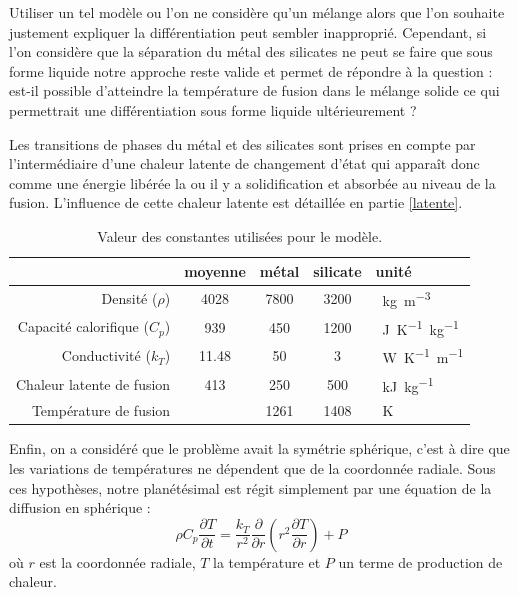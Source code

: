 \documentclass[10pt,a4paper]{article}
\numberwithin{equation}{section}
\begin{document}
Utiliser un tel modèle ou l'on ne considère qu'un mélange alors que l'on souhaite justement expliquer la différentiation peut sembler inapproprié. Cependant, si l'on considère que la séparation du métal des silicates ne peut se faire que sous forme liquide notre approche reste valide et permet de répondre à la question : est-il possible d'atteindre la température de fusion dans le mélange solide ce qui permettrait une différentiation sous forme liquide ultérieurement ? 
\medskip

Les transitions de phases du métal et des silicates sont prises en compte par l'intermédiaire d'une chaleur latente de changement d'état qui apparaît donc comme une énergie libérée la ou il y a solidification et absorbée au niveau de la fusion. L'influence de cette chaleur latente est détaillée en partie \ref{latente}.

\tabulinesep=0.3mm
\begin{table}[h!]
  \center
  \begin{tabu}{ r | c c c l}
     & moyenne & métal & silicate & unité\\ \hline
    Densité ($\rho$) & 4028 & 7800 &  3200 & \SI{}{kg.m^{-3}}\\ \hline
    Capacité calorifique ($C_p$) & 939 & 450 & 1200 &  \SI{}{J.K^{-1}.kg^{-1}} \\ \hline
    Conductivité ($k_T$)& 11.48 & 50 & 3 & \SI{}{W.K^{-1}.m^{-1}}  \\ \hline    
    Chaleur latente de fusion & 413 & 250 & 500 & \SI{}{kJ.kg^{-1}}\\ \hline
    Température de fusion & & 1261 & 1408 & \SI{}{K}\\ \hline
  \end{tabu}
  \caption{Valeur des constantes utilisées pour le modèle.}
  \label{constantes}
\end{table}

Enfin, on a considéré que le problème avait la symétrie sphérique, c'est à dire que les variations de températures ne dépendent que de la coordonnée radiale. Sous ces hypothèses, notre planétésimal est régit simplement par une équation de la diffusion en sphérique :
\begin{equation}
\rho C_p \dfrac{\partial T}{\partial t} = \frac{k_{T}}{r^2} \dfrac{\partial }{\partial r}\left( r^2 \dfrac{\partial T}{\partial r} \right) + P
\label{diffusion}
\end{equation}
où $r$ est la coordonnée radiale, $T$ la température et $P$ un terme de production de chaleur.
\medskip
\end{document}
